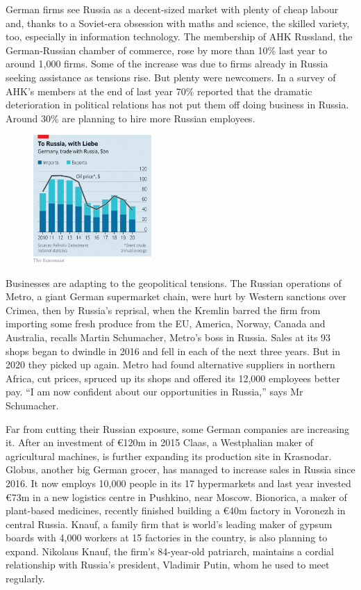 \documentclass{article}
\begin{document}
German firms see Russia as a decent-sized market with plenty of cheap labour and, thanks to a Soviet-era obsession with maths and science, the skilled variety, too, especially in information technology. The membership of AHK Russland, the German-Russian chamber of commerce, rose by more than 10\% last year to around 1,000 firms. Some of the increase was due to firms already in Russia seeking assistance as tensions rise. But plenty were newcomers. In a survey of AHK's members at the end of last year 70\% reported that the dramatic deterioration in political relations has not put them off doing business in Russia. Around 30\% are planning to hire more Russian employees. 

\begin{figure}[h]
\centering
\includegraphics[width=0.4\textwidth]{images/20210327_wbc203.png}
\end{figure}


Businesses are adapting to the geopolitical tensions. The Russian operations of Metro, a giant German supermarket chain, were hurt by Western sanctions over Crimea, then by Russia's reprisal, when the Kremlin barred the firm from importing some fresh produce from the EU, America, Norway, Canada and Australia, recalls Martin Schumacher, Metro's boss in Russia. Sales at its 93 shops began to dwindle in 2016 and fell in each of the next three years. But in 2020 they picked up again. Metro had found alternative suppliers in northern Africa, cut prices, spruced up its shops and offered its 12,000 employees better pay. ``I am now confident about our opportunities in Russia,'' says Mr Schumacher. 

Far from cutting their Russian exposure, some German companies are increasing it. After an investment of €120m in 2015 Claas, a Westphalian maker of agricultural machines, is further expanding its production site in Krasnodar. Globus, another big German grocer, has managed to increase sales in Russia since 2016. It now employs 10,000 people in its 17 hypermarkets and last year invested €73m in a new logistics centre in Pushkino, near Moscow. Bionorica, a maker of plant-based medicines, recently finished building a €40m factory in Voronezh in central Russia. Knauf, a family firm that is world's leading maker of gypsum boards with 4,000 workers at 15 factories in the country, is also planning to expand. Nikolaus Knauf, the firm's 84-year-old patriarch, maintains a cordial relationship with Russia's president, Vladimir Putin, whom he used to meet regularly. 
\end{document}
